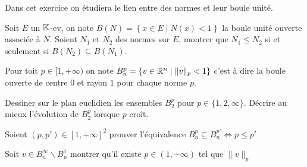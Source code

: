 \documentclass{report}
\begin{document}
\begin{exo}
    Dans cet exercice on étudiera le lien entre des normes et leur boule unité.
    \begin{q}{1}
        Soit \(E\) un \(\mathbb{K}\)-ev, on note \(B(N)=\left\{ x\in E\mid N(x)<1 \right\}\)
        la boule unité ouverte associée à \(N\). Soient \(N_1\) et \(N_2\) des normes sur \(E\),
        montrer que \(N_1\leq N_2\) si et seulement si \(B(N_2)\subseteq B(N_1)\).
    \end{q}
    Pour toit \(p\in[1,+\infty)\) on note \(B_n^p=\left\{ v\in\mathbb{R}^n\mid \|v\|_p<1 \right\}\)
    c'est à dire la boule ouverte de centre \(0\) et rayon \(1\) pour chaque norme \(p\).
    \begin{q}{2}
        Dessiner sur le plan euclidien les ensembles \(B_2^p\) pour \(p\in\{1,2,\infty\}\).
        Décrire au mieux l'évolution de \(B_2^p\) lorsque \(p\) croît.
    \end{q}
    \begin{q}{3}
        Soient \(\left(p,p'\right)\in[1,+\infty]^2\) prouver l'équivalence
        \(B_n^p\subseteq B_n^{p'} \Leftrightarrow p\leq p'\)
    \end{q}
    \begin{q}{4}
        Soit \(v\in B_n^\infty\backslash B_n^1\) montrer qu'il existe \(p\in(1,+\infty)\) tel que \(\|v\|_p\)
    \end{q}
\end{exo}
\end{document}
